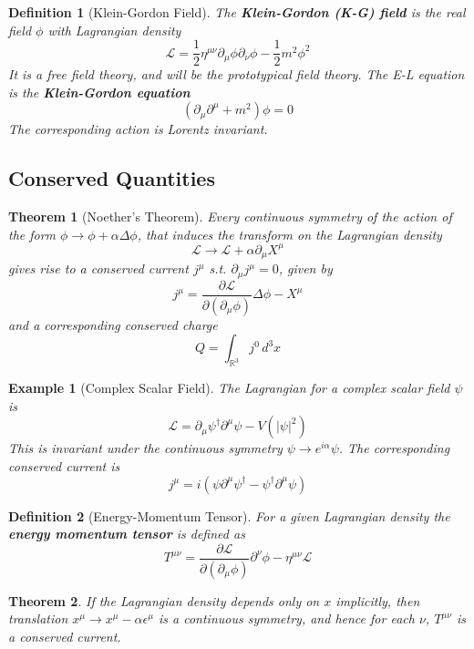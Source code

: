 \documentclass{article}
\newtheorem{theorem}{Theorem}[subsection]
\newtheorem{definition}{Definition}[subsection]
\newtheorem{example}{Example}[subsection]
\newcommand{\eps}{\epsilon}
\newcommand{\del}{\partial}
\newcommand{\bam}[1]{\textbf{#1}}
\newcommand{\mbb}[1]{\mathbb{#1}}
\newcommand{\mc}[1]{\mathcal{#1}}
\newcommand{\pd}[2][]{\frac{\partial#1}{\partial#2}} %
\begin{document}
\begin{definition}[Klein-Gordon Field]
The \bam{Klein-Gordon (K-G) field} is the real field $\phi$ with Lagrangian density
\[
\mc{L}=\frac{1}{2}\eta^{\mu\nu} \del_\mu\phi \del_\nu\phi-\frac{1}{2}m^2\phi^2
\]
It is a free field theory, and will be the prototypical field theory. The E-L equation is the \bam{Klein-Gordon equation}
\[
\left( \del_\mu \del^\mu + m^2 \right)\phi=0
\]
The corresponding action is Lorentz invariant. 
\end{definition}


\subsection{Conserved Quantities}

\begin{theorem}[Noether's Theorem]
Every continuous symmetry of the action of the form $\phi\to\phi+\alpha\Delta\phi$, that induces the transform on the Lagrangian density 
\[
\mc{L} \to \mc{L}+\alpha \del_\mu X^\mu
\]
gives rise to a conserved current $j^\mu$ s.t. $\del_\mu j^\mu = 0$, given by
\[
j^\mu = \pd[\mc{L}]{(\del_\mu \phi)}\Delta\phi-X^\mu
\]
and a corresponding conserved charge
\[
Q=\int_{\mbb{R}^3} j^0 \, d^3x
\]
\end{theorem}

\begin{example}[Complex Scalar Field]
The Lagrangian for a complex scalar field $\psi$ is 
\[
\mc{L}=\del_\mu \psi^\dagger \del^\mu \psi - V\left(|\psi|^2\right)
\]
This is invariant under the continuous symmetry $\psi \to e^{i\alpha}\psi$. The corresponding conserved current is 
\[
j^\mu=i\left( \psi\del^\mu\psi^\dagger-\psi^\dagger\del^\mu\psi \right)
\]
\end{example}

\begin{definition}[Energy-Momentum Tensor]
For a given Lagrangian density the \bam{energy momentum tensor} is defined as  
\[
T^{\mu\nu}=\pd[\mc{L}]{(\del_\mu \phi)} \del^\nu \phi - \eta^{\mu\nu}\mc{L}
\]
\end{definition}

\begin{theorem}
If the Lagrangian density depends only on $x$ implicitly, then translation $x^\mu \to x^\mu-\alpha\eps^\mu$ is a continuous symmetry, and hence for each $\nu$, $T^{\mu\nu}$ is a conserved current. 
\end{theorem}
\end{document}
